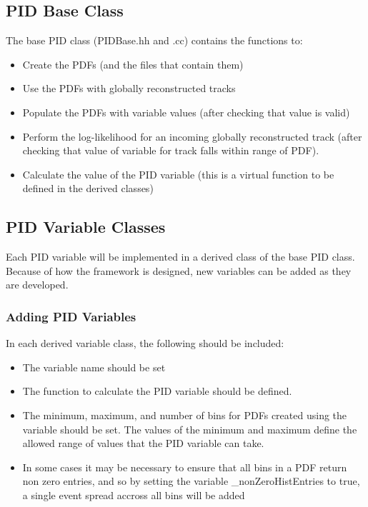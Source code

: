 \subsection{PID Base Class}
\label{PIDBase}
The base PID class (PIDBase.hh and .cc) contains the functions to:
\begin{itemize}
\item Create the PDFs (and the files that contain them)
\item Use the PDFs with globally reconstructed tracks
\item Populate the PDFs with variable values (after checking that 
value is valid)
\item Perform the log-likelihood for an incoming globally reconstructed 
track (after checking that value of variable for track falls within 
range of PDF).
\item Calculate the value of the PID variable (this is a virtual 
function to be defined in the derived classes)
\end{itemize}

\subsection{PID Variable Classes}
\label{PIDVar}
Each PID variable will be implemented in a derived class of the base PID class. Because of how the framework is designed, new variables can be added as they are developed.

\subsubsection{Adding PID Variables}
\label{addvar}
In each derived variable class, the following should be included:
\begin{itemize}
\item The variable name should be set
\item The function to calculate the PID variable should be defined.  
\item The minimum, maximum, and number of bins for PDFs created using 
the variable should be set. The values of the minimum and maximum 
define the allowed range of values that the PID variable can take.
\item In some cases it may be necessary to ensure that all bins in a 
PDF return non zero entries, and so by setting the variable 
\_nonZeroHistEntries to true, a single event spread accross all bins 
will be added
\end{itemize}

